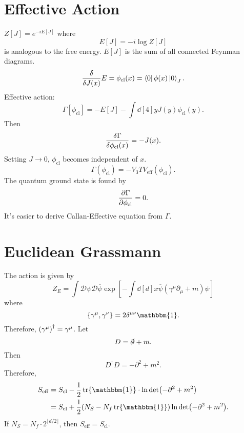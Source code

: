 \documentclass{article}
\begin{document}
\section{Effective Action}

$Z[J] = e^{-iE[J]}$ where
\[ E[J] = -i \log Z[J] \]
is analogous to the free energy.
$E[J]$ is the sum of all connected Feynman diagrams.
\[ \fdv{J(x)} E = \phi_{\mathrm{cl}}(x) = \bra{0}\phi(x)\ket{0}_{J}. \]
Effective action:
\[ \Gamma[\phi_{\mathrm{cl}}] = -E[J] - \int \dd[4]{y} J(y) \phi_{\mathrm{cl}}(y). \]
Then
\[ \fdv{\Gamma}{\phi_{\mathrm{cl}}(x)} = -J(x). \]
Setting $J\rightarrow 0$, $\phi_{\mathrm{cl}}$ becomes independent of $x$.
\[ \Gamma(\phi_{\mathrm{cl}}) = -V_3 T V_{\mathrm{eff}}(\phi_{\mathrm{cl}}). \]
The quantum ground state is found by
\[ \pdv{\Gamma}{\phi_{\mathrm{cl}}} = 0. \]
It's easier to derive Callan-Effective equation from $\Gamma$.

\section{Euclidean Grassmann}

The action is given by
\[ Z_E = \int \mathcal{D}\psi \mathcal{D}\overline{\psi} \exp[-\int \dd[d]{x} \overline{\psi}(\gamma^\mu \partial_\mu + m) \psi] \]
where
\[ \qty{\gamma^\mu,\gamma^\nu} = 2\delta^{\mu\nu}\mathbbm{1}. \]
Therefore, $\qty(\gamma^\mu)^\dagger = \gamma^\mu$.
Let
\[ D = \slashed{\partial} + m. \]
Then
\[ D^\dagger D = -\partial^2 + m^2. \]
Therefore,
\begin{align*}
    S_{\mathrm{eff}} &= S_{\mathrm{cl}} - \frac{1}{2}\tr\mathbbm{1} \cdot \ln \det(-\partial^2 + m^2) \\
    &= S_{\mathrm{cl}} + \frac{1}{2}(N_S - N_f \tr \mathbbm{1}) \ln \det(-\partial^2 + m^2).
\end{align*}
If $N_S = N_f \cdot 2^{\lfloor d/2 \rfloor}$, then $S_{\mathrm{eff}} = S_{\mathrm{cl}}$.

% 
% 
\end{document}
